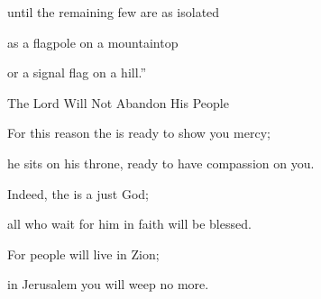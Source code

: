 {\par }{\Q until
the remaining
few are as isolated
\par }{\Q as a flagpole
on a mountaintop
\par }{\Q or a signal flag
on
a hill.”
\par }{\SH The Lord Will Not Abandon His People
\par }{\Q {}For this reason
the {}
is ready
to show you mercy;
\par }{\Q he sits on his throne,
ready
to have compassion
on you.

\par }{\Q Indeed,
the {}
is a just
God;
\par }{\Q all
who wait
for him in faith will be blessed.
\par }{\Q {}For
people
will live
in Zion;
\par }{\Q in Jerusalem
you will weep
no
more.

}
